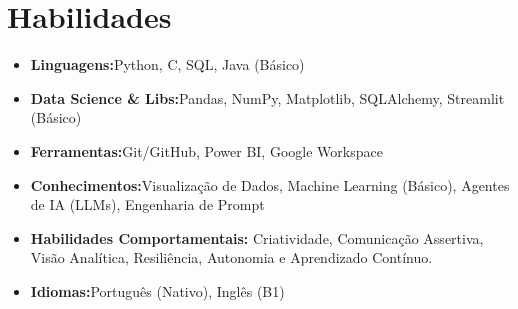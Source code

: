 \documentclass[a4paper,10pt]{article}
\begin{document}
\section{Habilidades}
    \begin{itemize}
        \item{\textbf{Linguagens:}Python, C, SQL, Java (Básico)}
        \item{\textbf{Data Science \& Libs:}Pandas, NumPy, Matplotlib, SQLAlchemy, Streamlit (Básico)} 
        \item{\textbf{Ferramentas:}Git/GitHub, Power BI, Google Workspace}
        \item{\textbf{Conhecimentos:}Visualização de Dados, Machine Learning (Básico), Agentes de IA (LLMs), Engenharia de Prompt}
        \item{\textbf{Habilidades Comportamentais:} Criatividade, Comunicação Assertiva, Visão Analítica, Resiliência, Autonomia e Aprendizado Contínuo.}
        \item{\textbf{Idiomas:}Português (Nativo), Inglês (B1)} 
    \end{itemize}
\end{document}
